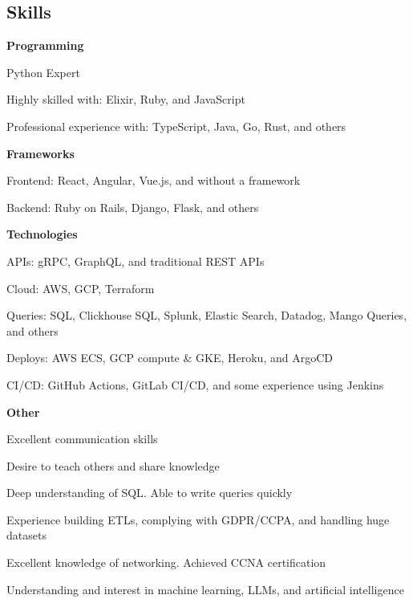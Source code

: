 \documentclass[margin,line]{resume}
\begin{document}
\begin{resume}
    \section{\mysidestyle \textbf{\large{S}\small{kills}}}
    \hspace{2.4mm}\textbf{Programming}\vspace{1mm}
    \begin{list2}
        \item Python Expert
        \item Highly skilled with: Elixir, Ruby, and JavaScript
        \item Professional experience with: TypeScript, Java, Go, Rust, and others
    \end{list2}\vspace{-1.5mm}

    \hspace{2.4mm}\textbf{Frameworks}\vspace{1mm}
    \begin{list2}
        \item Frontend: React, Angular, Vue.js, and without a framework
        \item Backend: Ruby on Rails, Django, Flask, and others
    \end{list2}\vspace{-1.5mm}

    \hspace{2.4mm}\textbf{Technologies}\vspace{1mm}
    \begin{list2}
        \item APIs: gRPC, GraphQL, and traditional REST APIs
        \item Cloud: AWS, GCP, Terraform
        \item Queries: SQL, Clickhouse SQL, Splunk, Elastic Search, Datadog, Mango Queries, and others
        \item Deploys: AWS ECS, GCP compute \& GKE, Heroku, and ArgoCD
        \item CI/CD: GitHub Actions, GitLab CI/CD, and some experience using Jenkins
    \end{list2}\vspace{-1.5mm}

    \hspace{2.4mm}\textbf{Other}\vspace{1mm}
    \begin{list2}
        \item Excellent communication skills
        \item Desire to teach others and share knowledge
        \item Deep understanding of SQL. Able to write queries quickly
        \item Experience building ETLs, complying with GDPR/CCPA, and handling huge datasets
        \item Excellent knowledge of networking. Achieved CCNA certification
        \item Understanding and interest in machine learning, LLMs, and artificial intelligence
    \end{list2}\vspace{-1.5mm}


\end{resume}
\end{document}
